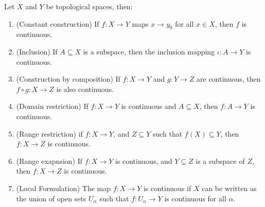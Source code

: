 \begin{theorem}\label{1.7.3}
    Let $X$ and  $Y$ be topological spaces, then:
        \begin{enumerate}[label=(\arabic*)]
            \item (Constant construction) If $f:X \rightarrow Y$ maps  $x \rightarrow y_0$ for all
                $x \in X$, then  $f$ is continuous.

            \item  (Inclusion) If $A \subseteq X$ is a subspace, then the inclusion mapping  $\iota:A
                \rightarrow Y$ is continuous.

            \item (Construction by composition) If $f:X \rightarrow Y$ and  $g:Y \rightarrow Z$ are
                continuous, then  $f \circ g: X \rightarrow Z$ is also continuous.

            \item  (Domain restriction) If  $f:X \rightarrow Y$ is continuous and  $A \subseteq X$,
                then  $f:A \rightarrow Y$ is continuous.

            \item  (Range restriction) if $f:X \rightarrow Y$, and  $Z \subseteq Y$ such that  $f(X)
                \subseteq Y$, then $f:X \rightarrow Z$ is continuous.

            \item  (Range exapnsion) If $f:X \rightarrow Y$ is continuous, and  $Y \subseteq Z$ is a
                subspace of  $Z$, then  $f:X \rightarrow Z$ is continuous.

            \item  (Local Formulation) The map $f:X \rightarrow Y$ is continuous if  $X$ can be
                written as the union of open sets  $U_{\alpha}$ such that $f:U_{\alpha} \rightarrow
                Y$ is continuous for all $\alpha$.
        \end{enumerate}
\end{theorem}
